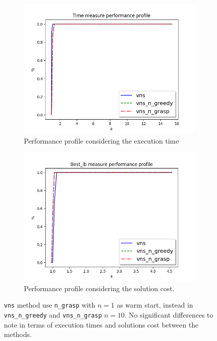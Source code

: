 \begin{figure}[!h]
	\begin{subfigure}{.5\columnwidth}
		\centering
		\includegraphics[width=\columnwidth]{../res/Lvns_LA_time.png}
		\caption{Performance profile considering the execution time}
		\label{fig:Lsubtour_hardfixing_vns_time}
	\end{subfigure}
\hfill
	\begin{subfigure}{.5\columnwidth}
		\centering
		\includegraphics[width=\columnwidth]{../res/Lvns_LA_lb.png}
		\caption{Performance profile considering the solution cost.}
		\label{fig:Lsubtour_hardfixing_vns_lb}
	\end{subfigure}
\caption{\texttt{vns} method use \texttt{n\_grasp} with $ n=1 $ as warm start, instead in \texttt{vns\_n\_greedy} and \texttt{vns\_n\_grasp} $ n=10 $. No significant differences to note in terms of execution times and solutions cost between the methods.}
\label{fig:Lvns_pp}
\end{figure}

